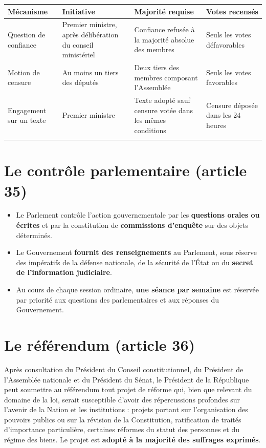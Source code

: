 \documentclass[11pt,a4paper,oneside]{report}
\begin{document}
\begin{longtable}{>{\raggedright\arraybackslash}p{} >{\raggedright\arraybackslash}p{} >{\raggedright\arraybackslash}p{} >{\raggedright\arraybackslash}p{}}
\toprule
\textbf{\color{navy}Mécanisme} & \textbf{\color{navy}Initiative} & \textbf{\color{navy}Majorité requise} & \textbf{\color{navy}Votes recensés} \\
\midrule\endhead
Question de confiance & Premier ministre, après délibération du conseil ministériel & Confiance refusée à la majorité absolue des membres & Seuls les votes défavorables \\
\addlinespace[1pt]
Motion de censure & Au moins un tiers des députés & Deux tiers des membres composant l'Assemblée & Seuls les votes favorables \\
\addlinespace[1pt]
Engagement sur un texte & Premier ministre & Texte adopté sauf censure votée dans les mêmes conditions & Censure déposée dans les 24 heures \\
\addlinespace[1pt]
\bottomrule
\end{longtable}
\section{Le contrôle parlementaire (article 35)}
\begin{itemize}
  \item Le Parlement contrôle l'action gouvernementale par les \textbf{questions orales ou écrites} et par la constitution de \textbf{commissions d'enquête} sur des objets déterminés.
  \item Le Gouvernement \textbf{fournit des renseignements} au Parlement, sous réserve des impératifs de la défense nationale, de la sécurité de l'État ou du \textbf{secret de l'information judiciaire}.
  \item Au cours de chaque session ordinaire, \textbf{une séance par semaine} est réservée par priorité aux questions des parlementaires et aux réponses du Gouvernement.
\end{itemize}
\section{Le référendum (article 36)}
Après consultation du Président du Conseil constitutionnel, du Président de l'Assemblée nationale et du Président du Sénat, le Président de la République peut soumettre au référendum tout projet de réforme qui, bien que relevant du domaine de la loi, serait susceptible d'avoir des répercussions profondes sur l'avenir de la Nation et les institutions : projets portant sur l'organisation des pouvoirs publics ou sur la révision de la Constitution, ratification de traités d'importance particulière, certaines réformes du statut des personnes et du régime des biens. Le projet est \textbf{adopté à la majorité des suffrages exprimés}.
\end{document}
